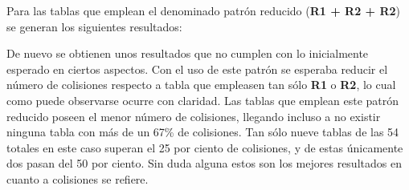 \documentclass[12pt,spanish,listoffigures,listoftables,listofalgorithms]{tfgetsinf}
\begin{document}
Para las tablas que emplean el denominado patrón reducido (\textbf{R1 + R2 + R2}) se generan los siguientes resultados:

\def\arraystretch{1.5}
\begin{table}[H]
	\centering
	\caption{Porcentajes de colisiones para las tablas empleando el patrón reducido}
	\label{colpp}
\end{table}

De nuevo se obtienen unos resultados que no cumplen con lo inicialmente esperado en ciertos aspectos. Con el uso de este patrón se esperaba reducir el número de colisiones respecto a tabla que empleasen tan sólo \textbf{R1} o \textbf{R2}, lo cual como puede observarse ocurre con claridad. Las tablas que emplean este patrón reducido poseen el menor número de colisiones, llegando incluso a no existir ninguna tabla con más de un 67\% de colisiones. Tan sólo nueve tablas de las 54 totales en este caso superan el 25 por ciento de colisiones, y de estas únicamente dos pasan del 50 por ciento. Sin duda alguna estos son los mejores resultados en cuanto a colisiones se refiere.
\end{document}

